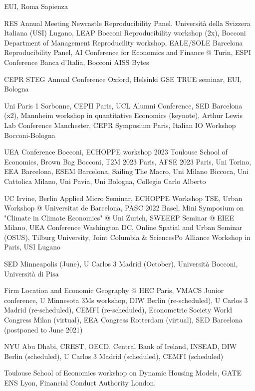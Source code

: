 \documentclass[letterpaper]{article}
\renewenvironment{itemize}{
  \begin{list}{}{
    \setlength{\leftmargin}{1.5em}
  }
}{
  \end{list}
}
\begin{document}
\begin{itemize}
\item[2027:] EUI, Roma Sapienza
\item[2026:] RES Annual Meeting Newcastle Reproducibility Panel, Università della Svizzera Italiana  (USI) Lugano, LEAP Bocconi Reproducibility workshop (2x), Bocconi Department of Management Reproducility workshop, EALE/SOLE Barcelona Reproducibility Panel, AI Conference for Economics and Finance @ Turin, ESPI Conference Banca d'Italia, Bocconi AISS Bytes
\item[2025:] CEPR STEG Annual Conference Oxford, Helsinki GSE TRUE seminar, EUI, Bologna 
\item[2024:] Uni Paris 1 Sorbonne, CEPII Paris, UCL Alumni Conference, SED Barcelona (x2), Mannheim workshop in quantitative Economics (keynote), Arthur Lewis Lab Conference Manchester, CEPR Symposium Paris, Italian IO Workshop Bocconi-Bologna
\item[2023:] UEA Conference Bocconi, ECHOPPE workshop 2023 Toulouse School of Economics, Brown Bag Bocconi, T2M 2023 Paris, AFSE 2023 Paris, Uni Torino, EEA Barcelona, ESEM Barcelona, Sailing The Macro, Uni Milano Biccoca, Uni Cattolica Milano, Uni Pavia, Uni Bologna, Collegio Carlo Alberto 
\item[2022:] UC Irvine, Berlin Applied Micro Seminar, ECHOPPE Workshop TSE, Urban Workshop @ Universitat de Barcelona, PASC 2022 Basel, Mini Symposium on "Climate in Climate Economics" @ Uni Zurich, SWEEEP Seminar @ EIEE Milano, UEA Conference Washington DC, Online Spatial and Urban Seminar (OSUS), Tilburg University, Joint Columbia \& SciencesPo Alliance Workshop in Paris, USI Lugano    
\item[2021:] SED Minneapolis (June), U Carlos 3 Madrid (October), Università Bocconi, Università di Pisa
\item[2020:] Firm Location and Economic Geography @ HEC Paris, VMACS Junior conference, U Minnesota 3Ms workshop, DIW Berlin (re-scheduled), U Carlos 3 Madrid (re-scheduled), CEMFI (re-scheduled), Econometric Society World Congress Milan (virtual), EEA Congress Rotterdam (virtual), SED Barcelona (postponed to June 2021)
\item[2019:] NYU Abu Dhabi, CREST, OECD, Central Bank of Ireland, INSEAD, DIW Berlin (scheduled), U Carlos 3 Madrid (scheduled), CEMFI (scheduled)
\item[2018:] Toulouse School of Economics workshop on Dynamic Housing Models, GATE ENS Lyon, Financial Conduct Authority London.

\end{itemize}
\end{document}

